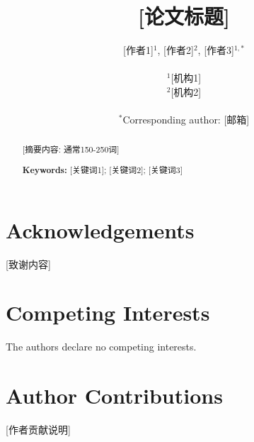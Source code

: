 \documentclass[12pt]{article}
\title{\textbf{[论文标题]}}
\author{
[作者1]$^{1}$, 
[作者2]$^{2}$, 
[作者3]$^{1,*}$ \\
\\
$^{1}$[机构1] \\
$^{2}$[机构2] \\
\\
$^{*}$Corresponding author: [邮箱]
}
\date{}
\begin{document}
\maketitle

\begin{abstract}
[摘要内容: 通常150-250词]

\noindent
\textbf{Keywords:} [关键词1]; [关键词2]; [关键词3]
\end{abstract}








\section*{Acknowledgements}
[致谢内容]

\section*{Competing Interests}
The authors declare no competing interests.

\section*{Author Contributions}
[作者贡献说明]



\end{document}
